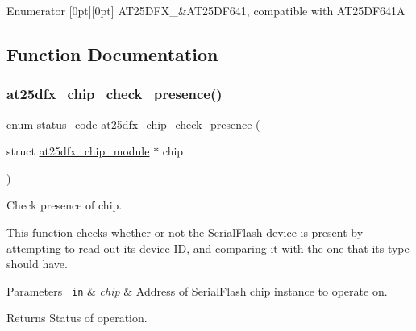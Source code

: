 \begin{DoxyEnumFields}{Enumerator}
[0pt][0pt]{}\mbox{\label{group__asfdoc__common2__at25dfx__group_gga98ba30dd90f741beb7f8d47e7725471dabe078bc157dc861a62e7bc5539bf0bd1}} 
A\+T25\+D\+F\+X\+\_&A\+T25\+D\+F641, compatible with A\+T25\+D\+F641A \\
\hline

\end{DoxyEnumFields}


\subsection{Function Documentation}
\mbox{\label{group__asfdoc__common2__at25dfx__group_gabc77a5e6b7714d6a3731505b24ac5082}} 
\subsubsection{\texorpdfstring{at25dfx\_chip\_check\_presence()}{at25dfx\_chip\_check\_presence()}}
{\footnotesize\ttfamily enum \mbox{\hyperlink{group__group__sam0__utils__status__codes_ga751c892e5a46b8e7d282085a5a5bf151}{status\+\_\+code}} at25dfx\+\_\+chip\+\_\+check\+\_\+presence (\begin{DoxyParamCaption}\item[{struct \mbox{\hyperlink{structat25dfx__chip__module}{at25dfx\+\_\+chip\+\_\+module}} $\ast$}]{chip }\end{DoxyParamCaption})}



Check presence of chip. 

This function checks whether or not the Serial\+Flash device is present by attempting to read out its device ID, and comparing it with the one that its type should have.


\begin{DoxyParams}[1]{Parameters}
\mbox{\texttt{ in}}  & {\em chip} & Address of Serial\+Flash chip instance to operate on.\\
\hline
\end{DoxyParams}
\begin{DoxyReturn}{Returns}
Status of operation. 
\end{DoxyReturn}


